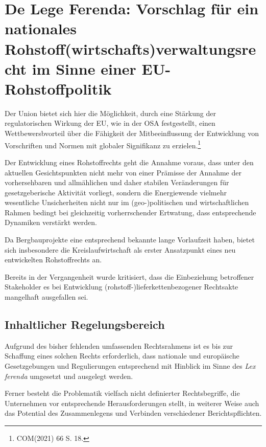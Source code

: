\documentclass[12pt,a4paper,oneside]{book} %
\begin{document}
	

\section{De Lege Ferenda: Vorschlag für ein nationales Rohstoff(wirtschafts)verwaltungsrecht im Sinne einer EU-Rohstoffpolitik}


Der Union bietet sich hier die Möglichkeit, durch eine Stärkung der regulatorischen Wirkung der EU, wie in der OSA festgestellt, einen Wettbewersbvorteil über die Fähigkeit der Mitbeeinflussung der Entwicklung von Vorschriften und Normen mit globaler Signifikanz zu erzielen.\footnote{COM(2021) 66 S. 18.}

Der Entwicklung eines Rohstoffrechts geht die Annahme voraus, dass unter den aktuellen Gesichtspunkten nicht mehr von einer Prämisse der Annahme der vorhersehbaren und allmählichen und daher stabilen Veränderungen für gesetzgeberische Aktivität vorliegt\autocite{Craig et al, Balancing stability and flexibility in adaptive governance: an analysis of tools available in U.S. environmental law}, sondern die Energiewende vielmehr wesentliche Unsicherheiten nicht nur im (geo-)politischen und wirtschaftlichen Rahmen bedingt bei gleichzeitig vorherrschender Ertwatung, dass entsprechende Dynamiken verstärkt werden.\autocite{bibid}

Da Bergbauprojekte eine entsprechend bekannte lange Vorlaufzeit haben, bietet sich insbesondere die Kreislaufwirtschaft als erster Ansatzpunkt eines neu entwickelten Rohstoffrechts an.

Bereits in der Vergangenheit wurde kritisiert, dass die Einbeziehung betroffener Stakeholder es bei Entwicklung (rohstoff-)lieferkettenbezogener Rechtsakte mangelhaft ausgefallen sei.

\subsection{Inhaltlicher Regelungsbereich}



Aufgrund des bisher fehlenden umfassenden Rechtsrahmens ist es bis zur Schaffung eines solchen Rechts erforderlich, dass nationale und europäische Gesetzgebungen und Regulierungen entsprechend mit Hinblick im Sinne des \textit{Lex ferenda} umgesetzt und ausgelegt werden. 

Ferner besteht die Problematik vielfach nicht definierter Rechtsbegriffe, die Unternehmen vor entsprechende Herausforderungen stellt, in weiterer Weise auch das Potential des Zusammenlegens und Verbinden verschiedener Berichtspflichten.\autocite{Schäffer, EuZW 2023, 695, 700}
\end{document}
